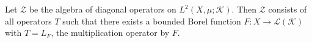 Let $\mathcal{Z}$ be the algebra of diagonal operators on $L^2(X, \mu; \mathcal{K})$. Then $\mathcal{Z}$ consists of all operators $T$ such that there exists a bounded Borel function $F: X \to \mathcal{L}(\mathcal{K})$ with $T = L_F$, the multiplication operator by $F$.
